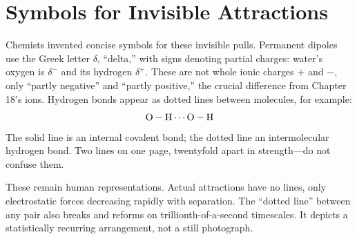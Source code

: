 \section{Symbols for Invisible Attractions}

Chemists invented concise symbols for these invisible pulls. Permanent dipoles use the Greek letter $\delta$, ``delta,'' with signs denoting partial charges: water's oxygen is $\delta^{-}$ and its hydrogen $\delta^{+}$. These are not whole ionic charges $+$ and $-$, only ``partly negative'' and ``partly positive,'' the crucial difference from Chapter 18's ions. Hydrogen bonds appear as dotted lines between molecules, for example:
\[
\mathrm{O-H \cdots O-H}
\]
The solid line is an internal  covalent bond; the dotted line an intermolecular hydrogen bond. Two lines on one page, twentyfold apart in strength---do not confuse them.

These remain human representations. Actual attractions have no lines, only electrostatic forces decreasing rapidly with separation. The ``dotted line'' between any pair also breaks and reforms on trillionth-of-a-second timescales. It depicts a statistically recurring arrangement, not a still photograph.

